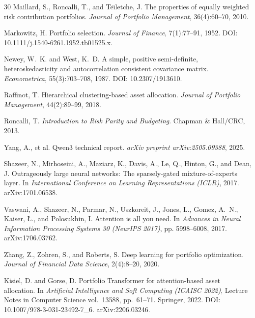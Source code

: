\documentclass{article}
\begin{document}
\begin{thebibliography}{30}
Maillard, S., Roncalli, T., and Te\"{\i}letche, J.
\newblock The properties of equally weighted risk contribution portfolios.
\newblock \emph{Journal of Portfolio Management}, 36(4):60--70, 2010.

Markowitz, H.
\newblock Portfolio selection.
\newblock \emph{Journal of Finance}, 7(1):77--91, 1952.
\newblock DOI: 10.1111/j.1540-6261.1952.tb01525.x.

Newey, W.~K. and West, K.~D.
\newblock A simple, positive semi-definite, heteroskedasticity and autocorrelation consistent covariance matrix.
\newblock \emph{Econometrica}, 55(3):703--708, 1987.
\newblock DOI: 10.2307/1913610.

Raffinot, T.
\newblock Hierarchical clustering-based asset allocation.
\newblock \emph{Journal of Portfolio Management}, 44(2):89--99, 2018.

Roncalli, T.
\newblock \emph{Introduction to Risk Parity and Budgeting}.
\newblock Chapman \& Hall/CRC, 2013.

Yang, A., et al.
\newblock Qwen3 technical report.
\newblock \emph{arXiv preprint arXiv:2505.09388}, 2025.

Shazeer, N., Mirhoseini, A., Maziarz, K., Davis, A., Le, Q., Hinton, G., and Dean, J.
\newblock Outrageously large neural networks: The sparsely-gated mixture-of-experts layer.
\newblock In \emph{International Conference on Learning Representations (ICLR)}, 2017. arXiv:1701.06538.

Vaswani, A., Shazeer, N., Parmar, N., Uszkoreit, J., Jones, L., Gomez, A.~N., Kaiser, {\L}., and Polosukhin, I.
\newblock Attention is all you need.
\newblock In \emph{Advances in Neural Information Processing Systems 30 (NeurIPS 2017)}, pp. 5998--6008, 2017. arXiv:1706.03762.

Zhang, Z., Zohren, S., and Roberts, S.
\newblock Deep learning for portfolio optimization.
\newblock \emph{Journal of Financial Data Science}, 2(4):8--20, 2020.

Kisiel, D. and Gorse, D.
\newblock Portfolio Transformer for attention-based asset allocation.
\newblock In \emph{Artificial Intelligence and Soft Computing (ICAISC 2022)}, Lecture Notes in Computer Science vol.~13588, pp.~61--71. Springer, 2022.
\newblock DOI: 10.1007/978-3-031-23492-7\_6. arXiv:2206.03246.


\end{thebibliography}
\end{document}
